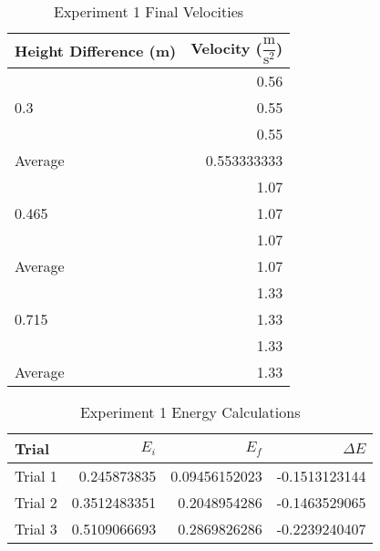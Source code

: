 \documentclass [12pt, letterpaper, twoside] {article}
\begin{document}
\begin {table}[h]
  \centering
  \begin {tabular} {| l | r |}
    \hline\hline 
    Height Difference (m) & Velocity (\(\dfrac{\text{m}}{\text{s}^2}\)) \\
    \hline
    \multirow {3}{*}{0.3} & 0.56 \\
    & 0.55 \\
    & 0.55 \\
    \hline
    Average & 0.553333333 \\
    \hline
    \multirow {3}{*}{0.465} & 1.07 \\
    & 1.07 \\
    & 1.07 \\
    \hline
    Average & 1.07 \\
    \hline
    \multirow {3}{*}{0.715} & 1.33 \\
    & 1.33 \\
    & 1.33 \\
    \hline
    Average & 1.33 \\
    \hline\hline
  \end {tabular}
  \caption {Experiment 1 Final Velocities}
\end {table}

\begin {table}[h]
  \centering
  \begin {tabular} {| l | r | r | r |}
    \hline\hline
    Trial & \(E_{i}\) & \(E_{f}\) & \(\Delta{E}\) \\
    \hline
    Trial 1 & 0.245873835 & 0.09456152023 & -0.1513123144 \\
    \hline
    Trial 2 & 0.3512483351 & 0.2048954286 & -0.1463529065 \\
    \hline
    Trial 3 & 0.5109066693 & 0.2869826286 & -0.2239240407 \\
    \hline\hline
  \end {tabular}
  \caption {Experiment 1 Energy Calculations}
\end {table}
\end{document}
